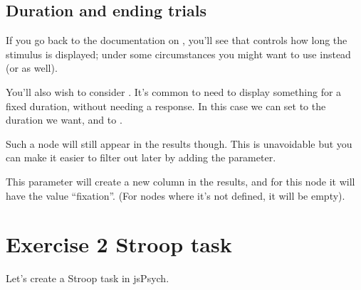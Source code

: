 \documentclass[letterpaper,10pt,english]{sphinxmanual}
\begin{document}
\subsection{Duration and ending trials}
\label{\detokenize{jspsych_au:duration-and-ending-trials}}
If you go back to the documentation on , you’ll see that
 controls how long the stimulus is displayed; under some
circumstances you might want to use  instead (or as well).

You’ll also wish to consider . It’s common to need to
display something for a fixed duration, without needing a response. In this
case we can set  to the duration we want, and
 to .

Such a node will still appear in the results though. This is unavoidable but
you can make it easier to filter out later by adding the  parameter.

\begin{sphinxVerbatim}[commandchars=\\\{\}]
   
   
   
   
   
      
\end{sphinxVerbatim}

This  parameter will create a new column in the results, and for this node
it will have the value “fixation”. (For nodes where it’s not defined, it
will be empty).


\section{Exercise 2 \textendash{} Stroop task}
\label{\detokenize{jspsych_au:exercise-2-stroop-task}}
Let’s create a Stroop task in jsPsych.
\end{document}
